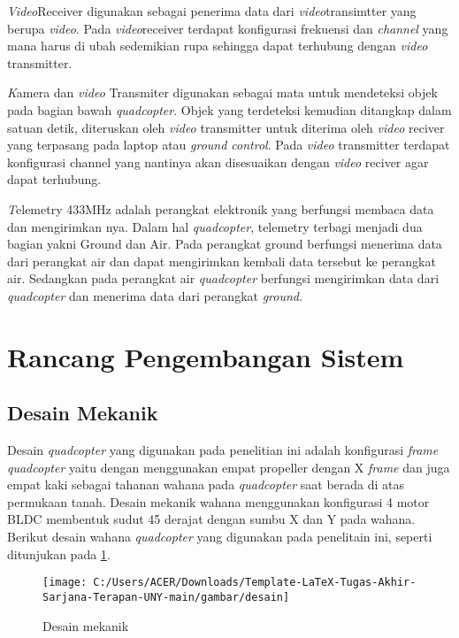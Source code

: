 \begin{packed_item}
	\item [7.]\textit{Video}Receiver
	digunakan sebagai penerima data dari \textit{video}transimtter yang berupa \textit{video}. Pada \textit{video}receiver terdapat konfigurasi frekuensi dan \textit{channel} yang mana harus di ubah sedemikian rupa sehingga dapat terhubung dengan \textit{video} transmitter.
	\item [8.]\textit Kamera dan \textit{video} Transmiter
	digunakan sebagai mata untuk mendeteksi objek pada bagian bawah \textit{quadcopter}. Objek yang terdeteksi kemudian ditangkap dalam satuan detik, diteruskan oleh \textit{video} transmitter untuk diterima oleh \textit{video} reciver yang terpasang pada laptop atau \textit{ground control}. Pada \textit{video} transmitter terdapat konfigurasi channel yang nantinya akan disesuaikan dengan \textit{video} reciver agar dapat terhubung.
	\item [9.]\textit Telemetry 433MHz
	adalah perangkat elektronik yang berfungsi membaca data dan mengirimkan nya. Dalam hal \textit{quadcopter}, telemetry terbagi menjadi dua bagian yakni Ground dan Air. Pada  perangkat ground berfungsi menerima data dari perangkat air dan dapat mengirimkan kembali data tersebut ke perangkat air. Sedangkan pada perangkat air \textit{quadcopter} berfungsi mengirimkan data dari \textit{quadcopter }dan menerima data dari perangkat \textit{ground}.
\end{packed_item}

\section{Rancang Pengembangan Sistem}
\subsection{Desain Mekanik}
Desain \textit{quadcopter} yang digunakan pada penelitian ini adalah konfigurasi \textit{frame quadcopter} yaitu dengan menggunakan empat propeller dengan X \textit{frame} dan juga empat kaki sebagai tahanan wahana pada \textit{quadcopter} saat berada di atas permukaan tanah. Desain mekanik wahana menggunakan konfigurasi 4 motor BLDC membentuk sudut 45 derajat dengan sumbu X dan Y pada wahana. Berikut desain wahana \textit{quadcopter} yang digunakan pada penelitain ini, seperti ditunjukan pada \cref{fig:desain}.

\begin{figure}[H]
	\centering
	\texttt{[image: C:/Users/ACER/Downloads/Template-LaTeX-Tugas-Akhir-Sarjana-Terapan-UNY-main/gambar/desain]}
	\caption{Desain mekanik}
	\label{fig:desain}
\end{figure}

